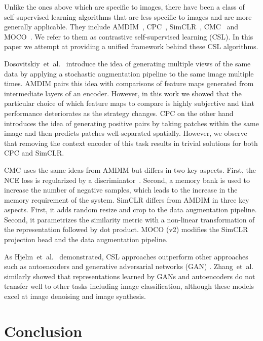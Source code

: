 \documentclass{article}
\begin{document}
Unlike the ones above which are specific to images, there have been a class of self-supervised learning algorithms that are less specific to images and are more generally applicable. They include  AMDIM~\cite{hjelm2018learning}, CPC~\cite{henaff2019data}, SimCLR~\cite{chen2020simple}, CMC~\cite{tian2019contrastive} and MOCO~\cite{chen2020mocov2,he2019momentum}. We refer to them as contrastive self-supervised learning (CSL). In this paper we attempt at providing a unified framework behind these CSL algorithms.

Dosovitskiy~et~al.~\cite{dosovitskiy2014discriminative} introduce the idea of generating multiple views of the same data by applying a stochastic augmentation pipeline to the same image multiple times. AMDIM pairs this idea with comparisons of feature maps generated from intermediate layers of an encoder. However, in this work we showed that the particular choice of which feature maps to compare is highly subjective and that performance deteriorates as the strategy changes. CPC on the other hand introduces the idea of generating positive pairs by taking patches within the same image and then predicts patches well-separated spatially. However, we observe that removing the context encoder of this task results in trivial solutions for both CPC and SimCLR.

CMC uses the same ideas from AMDIM but differs in two key aspects. First, the NCE loss is regularized by a discriminator~\cite{goodfellow2014generative}. Second, a memory bank is used to increase the number of negative samples, which leads to the increase in the memory requirement of the system. SimCLR differs from AMDIM in three key aspects. First, it adds random resize and crop to the data augmentation pipeline. Second, it parametrizes the similarity metric with a non-linear transformation of the representation followed by dot product. MOCO (v2) modifies the SimCLR projection head  and the data augmentation pipeline.

As Hjelm~et~al.~\cite{hjelm2018learning} demonstrated, CSL approaches outperform other approaches such as autoencoders \cite{rumelhalt1986learning,baldi1989neural} and generative adversarial networks (GAN) \cite{goodfellow2014generative}. Zhang~et~al.~\cite{zhang2016colorful} similarly showed that  representations learned by GANs and autoencoders do not transfer well to other tasks including image classification, although these models excel at image denoising and image synthesis.

\section{Conclusion} 
\end{document}
